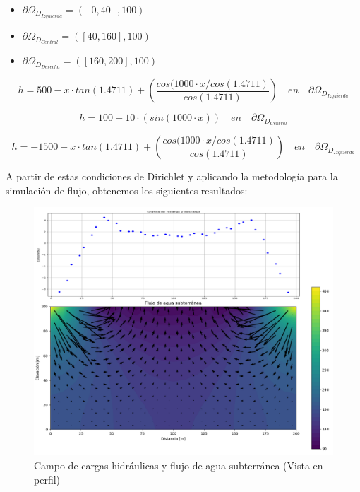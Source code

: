 \begin{itemize}
\item  ${\partial}\Omega_{D_{Izquierda}}={([0,40],100)}$
\item  ${\partial}\Omega_{D_{Central}}={([40,160],100)}$
\item  ${\partial}\Omega_{D_{Derecha}}={([160,200],100)}$ 
\end{itemize}

 \begin{equation}
 \label{eqn:mys11}
    h=500-x{\cdot}tan(1.4711)+(\dfrac{cos(1000{\cdot}x/cos(1.4711) }{cos(1.4711)}) \quad en \quad  {\partial}\Omega_{D_{Izquierda}}    
    \end{equation}

\begin{equation}
 \label{eqn:mys12}
    h= 100+10{\cdot}(sin(1000{\cdot}x)) \quad  en \quad {\partial}\Omega_{D_{Central}}
\end{equation}

\begin{equation}
 \label{eqn:mys13}
    h= -1500+x{\cdot}tan(1.4711)+(\dfrac{cos(1000{\cdot}x/cos(1.4711) }{cos(1.4711)}) \quad en \quad  {\partial}\Omega_{D_{Izquierda}}   
\end{equation}

A partir de estas condiciones de Dirichlet y aplicando la metodología para la simulación de flujo, obtenemos los siguientes resultados:

 \begin{figure}[H]
\centering
\includegraphics[scale=0.55]{Figura_29e.png}
\caption{ Campo de cargas hidráulicas y flujo de agua subterránea (Vista en perfil)}
\label{Figura20:2}
\end{figure}

